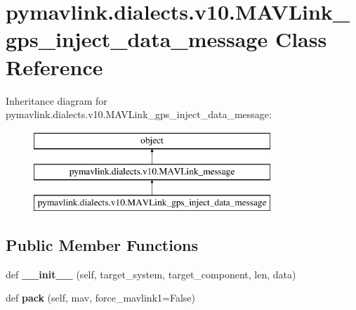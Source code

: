 \hypertarget{classpymavlink_1_1dialects_1_1v10_1_1MAVLink__gps__inject__data__message}{}\section{pymavlink.\+dialects.\+v10.\+M\+A\+V\+Link\+\_\+gps\+\_\+inject\+\_\+data\+\_\+message Class Reference}
\label{classpymavlink_1_1dialects_1_1v10_1_1MAVLink__gps__inject__data__message}
Inheritance diagram for pymavlink.\+dialects.\+v10.\+M\+A\+V\+Link\+\_\+gps\+\_\+inject\+\_\+data\+\_\+message\+:\begin{figure}[H]
\begin{center}
\leavevmode
\includegraphics[height=3.000000cm]{classpymavlink_1_1dialects_1_1v10_1_1MAVLink__gps__inject__data__message}
\end{center}
\end{figure}
\subsection*{Public Member Functions}
\begin{DoxyCompactItemize}
\item 
\mbox{\label{classpymavlink_1_1dialects_1_1v10_1_1MAVLink__gps__inject__data__message_ab02b8027e7d23c17a7dee212b7e1d409}} 
def {\bfseries \+\_\+\+\_\+init\+\_\+\+\_\+} (self, target\+\_\+system, target\+\_\+component, len, data)
\item 
\mbox{\label{classpymavlink_1_1dialects_1_1v10_1_1MAVLink__gps__inject__data__message_a97fd7e724b0a8ff796bbfca761b184f5}} 
def {\bfseries pack} (self, mav, force\+\_\+mavlink1=False)
\end{DoxyCompactItemize}
